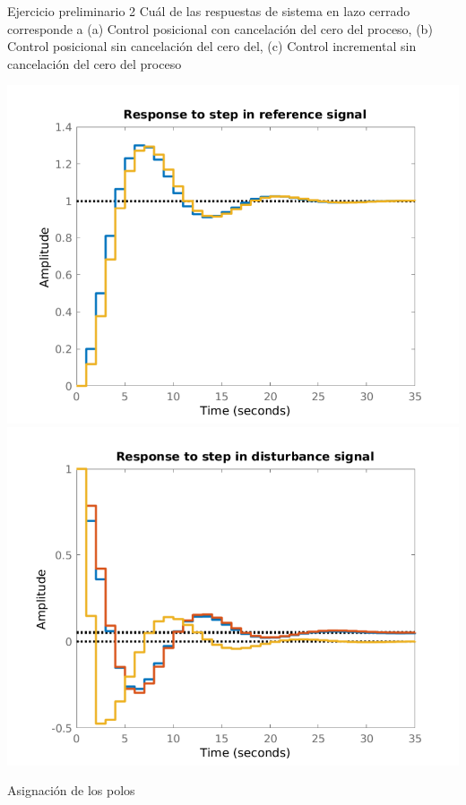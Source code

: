 \documentclass[presentation,aspectratio=169]{beamer}
\begin{document}
\begin{frame}[label={sec:orgc14b775}]{Ejercicio preliminario 2}
Cuál de las respuestas de sistema en lazo cerrado corresponde a (a) Control posicional \alert{con} cancelación del cero del proceso,  (b) Control posicional \alert{sin} cancelación del cero del, (c) Control \alert{incremental} sin cancelación del cero del proceso
\begin{center}
\includegraphics[width=0.45\linewidth]{../../figures/aw5_3_refstep}
\includegraphics[width=0.45\linewidth]{../../figures/aw5_3_diststep}
\end{center}
\end{frame}

\begin{frame}[label={sec:orga03fa70}]{Asignación de los polos}
\end{frame}
\end{document}
